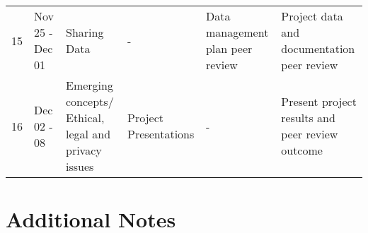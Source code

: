 \documentclass[
]{article}
\begin{document}
\begin{longtable}[]{@{}llllll@{}}
\begin{minipage}[t]{0.05\columnwidth}
15\strut
\end{minipage} & \begin{minipage}[t]{0.11\columnwidth}\raggedright
Nov 25 - Dec 01\strut
\end{minipage} & \begin{minipage}[t]{0.18\columnwidth}\raggedright
Sharing Data\strut
\end{minipage} & \begin{minipage}[t]{0.18\columnwidth}\raggedright
-\strut
\end{minipage} & \begin{minipage}[t]{0.14\columnwidth}\raggedright
Data management plan peer review\strut
\end{minipage} & \begin{minipage}[t]{0.17\columnwidth}\raggedright
Project data and documentation peer review\strut
\end{minipage}\tabularnewline
\begin{minipage}[t]{0.05\columnwidth}\raggedright
16\strut
\end{minipage} & \begin{minipage}[t]{0.11\columnwidth}\raggedright
Dec 02 - 08\strut
\end{minipage} & \begin{minipage}[t]{0.18\columnwidth}\raggedright
Emerging concepts/ Ethical, legal and privacy issues\strut
\end{minipage} & \begin{minipage}[t]{0.18\columnwidth}\raggedright
Project Presentations\strut
\end{minipage} & \begin{minipage}[t]{0.14\columnwidth}\raggedright
-\strut
\end{minipage} & \begin{minipage}[t]{0.17\columnwidth}\raggedright
Present project results and peer review outcome\strut
\end{minipage}\tabularnewline
\bottomrule
\end{longtable}

\hypertarget{additional-notes}{%
\section{Additional Notes}\label{additional-notes}}
\end{document}
